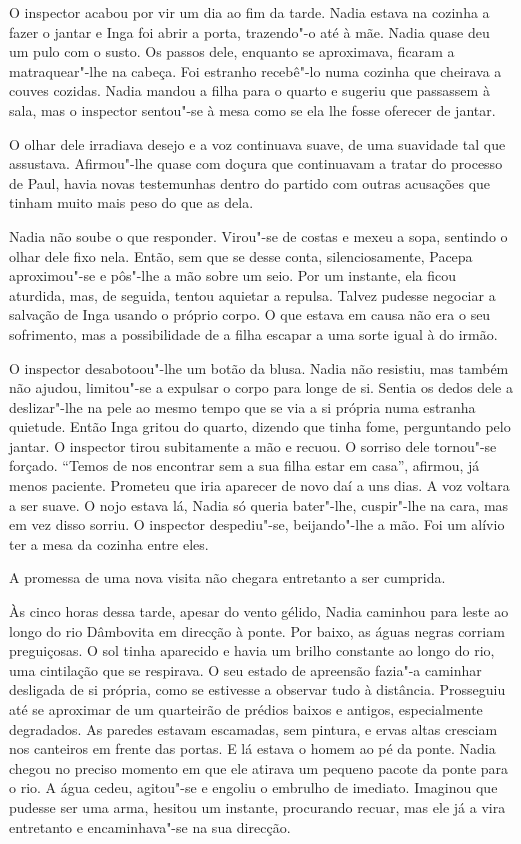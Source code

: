 O inspector acabou por vir um dia ao fim da tarde. Nadia estava na
cozinha a fazer o jantar e Inga foi abrir a porta, trazendo"-o até à mãe.
Nadia quase deu um pulo com o susto. Os passos dele, enquanto se
aproximava, ficaram a matraquear"-lhe na cabeça. Foi estranho recebê"-lo numa cozinha que cheirava a couves cozidas. Nadia mandou a filha
para o quarto e sugeriu que passassem à sala, mas o inspector sentou"-se
à mesa como se ela lhe fosse oferecer de jantar.

O olhar dele irradiava desejo e a voz continuava suave, de uma suavidade
tal que assustava. Afirmou"-lhe quase com doçura que continuavam a tratar
do processo de Paul, havia novas testemunhas dentro do partido com
outras acusações que tinham muito mais peso do que as dela.

Nadia não soube o que responder. Virou"-se de costas e mexeu a sopa,
sentindo o olhar dele fixo nela. Então, sem que se desse conta,
silenciosamente, Pacepa aproximou"-se e pôs"-lhe a mão sobre um seio. Por
um instante, ela ficou
aturdida, mas, de seguida, tentou aquietar a repulsa. Talvez pudesse
negociar a salvação de Inga usando o próprio corpo. O que estava em
causa não era o seu sofrimento, mas a possibilidade de a filha escapar a
uma sorte igual à do irmão.

O inspector desabotoou"-lhe um botão da blusa. Nadia não resistiu, mas
também não ajudou, limitou"-se a expulsar o corpo para longe de si.
Sentia os dedos dele a deslizar"-lhe na pele ao mesmo tempo que se via a si própria numa estranha
quietude. Então Inga gritou do quarto, dizendo que tinha fome,
perguntando pelo jantar. O inspector tirou subitamente a mão e recuou. O
sorriso dele tornou"-se forçado. ``Temos de nos encontrar sem a sua
filha estar em casa'', afirmou, já menos paciente. Prometeu que iria
aparecer de novo daí a uns dias. A voz voltara a ser suave. O nojo
estava lá, Nadia só queria bater"-lhe, cuspir"-lhe na cara, mas em vez
disso sorriu. O inspector despediu"-se, beijando"-lhe a mão. Foi um alívio
ter a mesa da cozinha entre eles.

A promessa de uma nova visita não chegara entretanto a ser cumprida.

Às cinco horas dessa tarde, apesar do vento gélido, Nadia caminhou para
leste ao longo do rio Dâmbovita em direcção à ponte. Por baixo, as águas
negras corriam preguiçosas. O sol tinha aparecido e havia um brilho
constante ao longo do rio, uma cintilação que se respirava. O seu
estado de apreensão fazia"-a caminhar desligada de si própria, como se
estivesse a observar tudo à distância. Prosseguiu até se aproximar de um
quarteirão de prédios
baixos e antigos, especialmente degradados. As paredes estavam
escamadas, sem pintura, e ervas altas cresciam nos canteiros em frente
das portas. E lá estava o homem ao pé da ponte. Nadia chegou no preciso
momento em que ele atirava um pequeno pacote da ponte para o rio. A água
cedeu, agitou"-se e engoliu o embrulho de imediato. Imaginou que
pudesse ser uma arma, hesitou um instante, procurando recuar, mas ele
já a vira entretanto e encaminhava"-se na sua direcção.

